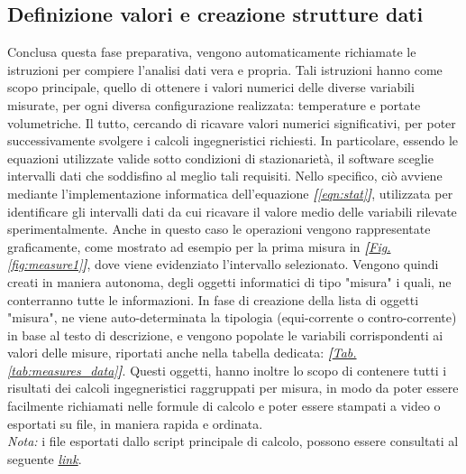 \documentclass[a4paper,10pt]{article}                                                                                       %
\begin{document}
\subsection{Definizione valori e creazione strutture dati}                                                                  %
\label{subsec:valsdef_datastruct}                                                                                           %
  Conclusa questa fase preparativa, vengono automaticamente richiamate le istruzioni per compiere l'analisi dati vera e
  propria. Tali istruzioni hanno come scopo principale, quello di ottenere i valori numerici delle diverse variabili
  misurate, per ogni diversa configurazione realizzata: temperature e portate volumetriche. Il tutto, cercando di ricavare
  valori numerici significativi, per poter successivamente svolgere i calcoli ingegneristici richiesti. In particolare,
  essendo le equazioni utilizzate valide sotto condizioni di stazionarietà, il software sceglie intervalli dati che
  soddisfino al meglio tali requisiti. Nello specifico, ciò avviene mediante l'implementazione informatica dell'equazione
  \textit{\textbf{[}\ref{eqn:stat}\textbf{]}}, utilizzata per identificare gli intervalli dati da cui ricavare il valore
  medio delle variabili rilevate sperimentalmente. Anche in questo caso le operazioni vengono rappresentate graficamente,
  come mostrato ad esempio per la prima misura in
  \textit{\textbf{[}\hyperref[fig:measure1]{Fig. }\ref{fig:measure1}\textbf{]}}, dove viene evidenziato l'intervallo
  selezionato. Vengono quindi creati in maniera autonoma, degli oggetti informatici di tipo "misura" i quali, ne
  conterranno tutte le informazioni. In fase di creazione della lista di oggetti "misura", ne viene auto-determinata la
  tipologia (equi-corrente o contro-corrente) in base al testo di descrizione, e vengono popolate le variabili
  corrispondenti ai valori delle misure, riportati anche nella tabella dedicata:
  \textit{\textbf{[}\hyperref[tab:measures_data]{Tab. }\ref{tab:measures_data}\textbf{]}}. Questi oggetti, hanno inoltre
  lo scopo di contenere tutti i risultati dei calcoli ingegneristici raggruppati per misura, in modo da poter essere
  facilmente richiamati nelle formule di calcolo e poter essere stampati a video o esportati su file, in maniera rapida
  e ordinata.\vspace{2mm}\\
  \textit{Nota:} i file esportati dallo script principale di calcolo, possono essere consultati al seguente
  \textit{\href{https://github.com/CristianMerli/DataAnalysis/tree/master/final_doc/code_exports/output}{link}}.
\end{document}
